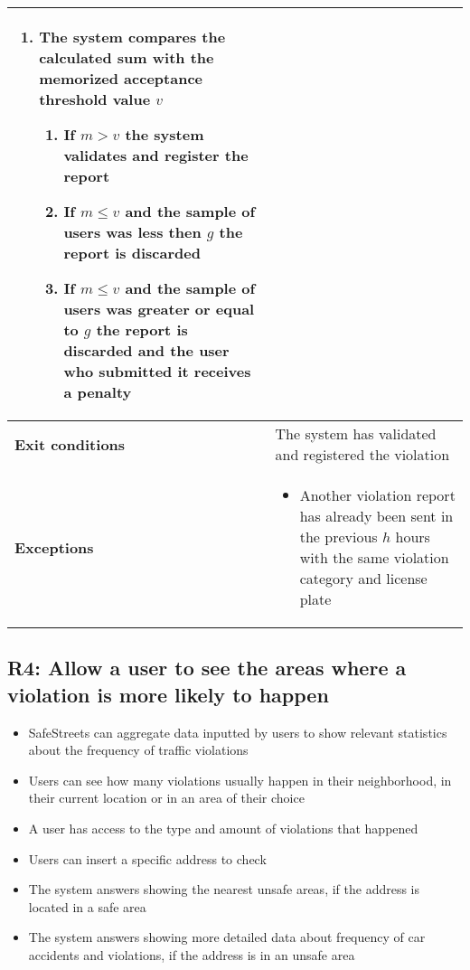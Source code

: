 \begin{description}
\begin{center}
\begin{tabular}{|p{3cm}|p{7cm}|}
\begin{enumerate}
\begin{itemize}
                    \end{itemize}
                    \item The system compares the calculated sum with the memorized acceptance threshold value $v$
                    \begin{enumerate}
                        \item If $m > v$ the system validates and register the report
                        \item If $m \leq v$ and the sample of users was less then $g$ the report is discarded
                        \item If $m \leq v$ and the sample of users was greater or equal to $g$ the report is discarded and the user who submitted it receives a penalty
                    \end{enumerate}
                \end{enumerate} \\
                \hline
                \textbf{Exit conditions} & The system has validated and registered the violation \\
                \hline
                \textbf{Exceptions}
                & \begin{itemize}
                    \item Another violation report has already been sent in the previous $h$ hours with the same violation category and license plate
                \end{itemize} \\
                \hline
            \end{tabular}
        \end{center}
\end{description}

\subsection{R4: Allow a user to see the areas where a violation is more likely to happen}
\begin{itemize}
    \item SafeStreets can aggregate data inputted by users to show relevant statistics about the frequency of traffic violations
    \item Users can see how many violations usually happen in their neighborhood, in their current location or in an area of their choice
    \item A user has access to the type and amount of violations that happened
    \item Users can insert a specific address to check
    \item The system answers showing the nearest unsafe areas, if the address is located in a safe area
    \item The system answers showing more detailed data about frequency of car accidents and violations, if the address is in an unsafe area
\end{itemize}

